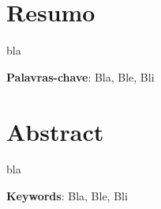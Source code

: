 \thispagestyle{empty}
\chapter*{Resumo}
 {bla}

\textbf{Palavras-chave}: Bla, Ble, Bli


\chapter*{Abstract}
 {bla}

\textbf{Keywords}: Bla, Ble, Bli

\thispagestyle{empty}
